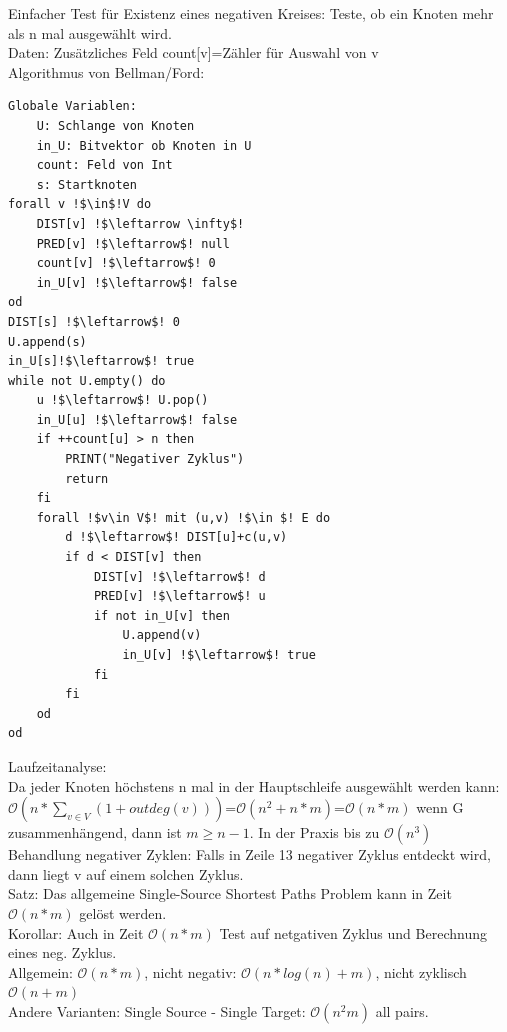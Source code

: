 \documentclass[a4paper]{article}
\newcommand{\oh}[1]{$\mathcal{O}(#1)$}
\begin{document}
Einfacher Test für Existenz eines negativen Kreises: Teste, ob ein Knoten mehr als n mal ausgewählt wird.\\
Daten: Zusätzliches Feld count[v]=Zähler für Auswahl von v\\
Algorithmus von Bellman/Ford:
\begin{lstlisting}[escapechar=!,frame=single]
Globale Variablen:
	U: Schlange von Knoten
	in_U: Bitvektor ob Knoten in U
	count: Feld von Int
	s: Startknoten
forall v !$\in$!V do
	DIST[v] !$\leftarrow \infty$!
	PRED[v] !$\leftarrow$! null
	count[v] !$\leftarrow$! 0
	in_U[v] !$\leftarrow$! false
od
DIST[s] !$\leftarrow$! 0
U.append(s)
in_U[s]!$\leftarrow$! true
while not U.empty() do
	u !$\leftarrow$! U.pop()
	in_U[u] !$\leftarrow$! false
	if ++count[u] > n then
		PRINT("Negativer Zyklus")
		return
	fi
	forall !$v\in V$! mit (u,v) !$\in $! E do
		d !$\leftarrow$! DIST[u]+c(u,v)
		if d < DIST[v] then
			DIST[v] !$\leftarrow$! d
			PRED[v] !$\leftarrow$! u
			if not in_U[v] then
				U.append(v)
				in_U[v] !$\leftarrow$! true
			fi
		fi
	od
od
\end{lstlisting}
Laufzeitanalyse:\\
Da jeder Knoten höchstens n mal in der Hauptschleife ausgewählt werden kann: \oh{n*\sum_{v\in V} (1+outdeg(v))}=\oh{n^2+n*m}=\oh{n*m} wenn G zusammenhängend, dann ist $m\geq n-1$. In der Praxis bis zu \oh{n^3}\\
Behandlung negativer Zyklen: Falls in Zeile 13 negativer Zyklus entdeckt wird, dann liegt v auf einem solchen Zyklus.\\
Satz: Das allgemeine Single-Source Shortest Paths Problem kann in Zeit \oh{n*m} gelöst werden.\\
Korollar: Auch in Zeit \oh{n*m} Test auf netgativen Zyklus und Berechnung eines neg. Zyklus.\\
Allgemein: \oh{n*m}, nicht negativ: \oh{n*log(n)+m}, nicht zyklisch \oh{n+m}\\
Andere Varianten: Single Source - Single Target: \oh{n^2m} all pairs.\\
\end{document}
